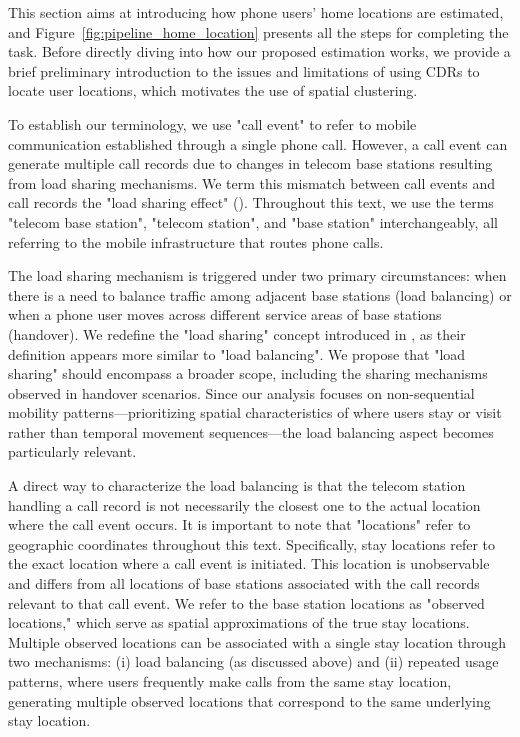 This section aims at introducing how phone users' home locations are estimated, and Figure~\ref{fig:pipeline_home_location} presents all the steps for completing the task.
Before directly diving into how our proposed estimation works, we provide a brief preliminary introduction to the issues and limitations of using CDRs to locate user locations, which motivates the use of spatial clustering.

To establish our terminology, we use "call event" to refer to mobile communication established through a single phone call.
However, a call event can generate multiple call records due to changes in telecom base stations resulting from load sharing mechanisms.
We term this mismatch between call events and call records the "load sharing effect" (\cite{ayesha2019user}).
Throughout this text, we use the terms "telecom base station", "telecom station", and "base station" interchangeably, all referring to the mobile infrastructure that routes phone calls.

The load sharing mechanism is triggered under two primary circumstances: when there is a need to balance traffic among adjacent base stations (load balancing) or when a phone user moves across different service areas of base stations (handover).
We redefine the "load sharing" concept introduced in \cite{ayesha2019user}, as their definition appears more similar to "load balancing".
We propose that "load sharing" should encompass a broader scope, including the sharing mechanisms observed in handover scenarios. Since our analysis focuses on non-sequential mobility patterns---prioritizing spatial characteristics of where users stay or visit rather than temporal movement sequences---the load balancing aspect becomes particularly relevant.

A direct way to characterize the load balancing is that the telecom station handling a call record is not necessarily the closest one to the actual location where the call event occurs.
It is important to note that "locations" refer to geographic coordinates throughout this text.
Specifically, stay locations refer to the exact location where a call event is initiated.
This location is unobservable and differs from all locations of base stations associated with the call records relevant to that call event.
We refer to the base station locations as "observed locations," which serve as spatial approximations of the true stay locations.
Multiple observed locations can be associated with a single stay location through two mechanisms: (i) load balancing (as discussed above) and (ii) repeated usage patterns, where users frequently make calls from the same stay location, generating multiple observed locations that correspond to the same underlying stay location.

